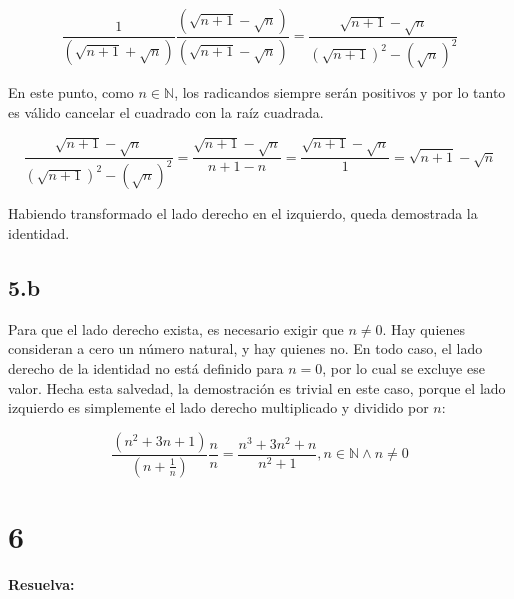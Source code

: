 \documentclass{article}
\begin{document}
\begin{equation}
\frac{1}{(\sqrt{n + 1}+\sqrt{n})} \frac{(\sqrt{n+1}-\sqrt{n})}{(\sqrt{n+1}-\sqrt{n})} = \frac{\sqrt{n+1}-\sqrt{n}}{(\sqrt{n+1})^2 -(\sqrt{n})^2 }
\end{equation}

En este punto, como $n \in \mathbb{N}$, los radicandos siempre serán positivos y por lo tanto es válido cancelar el cuadrado con la raíz cuadrada. 

\begin{equation}
\frac{\sqrt{n+1}-\sqrt{n}}{(\sqrt{n+1})^2 -(\sqrt{n})^2 } = \frac{\sqrt{n+1}-\sqrt{n}}{n+1-n} = \frac{\sqrt{n+1}-\sqrt{n}}{1} = \sqrt{n+1}-\sqrt{n}
\end{equation}

Habiendo transformado el lado derecho en el izquierdo, queda demostrada la identidad.

\subsection*{5.b}
\label{subsec:5.b}

Para que el lado derecho exista, es necesario exigir que $n \neq 0$. Hay quienes consideran a cero un número natural, y hay quienes no. En todo caso, el lado derecho de la identidad no está definido para $n = 0$, por lo cual se excluye ese valor. Hecha esta salvedad, la demostración es trivial en este caso, porque el lado izquierdo es simplemente el lado derecho multiplicado y dividido por $n$:

\begin{equation}
\frac{(n^2 + 3n + 1)}{(n + \frac{1}{n})} \frac{n}{n} = \frac{n^3 + 3n^2 + n}{n^2 + 1}, n \in \mathbb{N} \wedge n \neq 0
\end{equation}

\section*{6}
\label{sec:6}

\textbf{Resuelva:}
\end{document}
